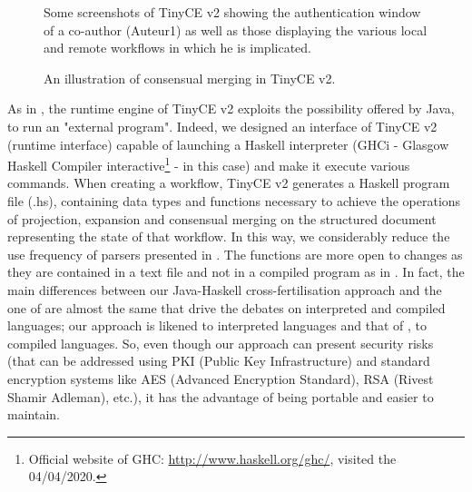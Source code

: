 \begin{figure}[ht!]
	\noindent
	\caption{Some screenshots of TinyCE v2 showing the authentication window of a co-author (Auteur1) as well as those displaying the various local and remote workflows in which he is implicated.}
	\label{chap2:fig:user-connexion}
\end{figure}

\begin{figure}[ht!]
	\noindent
	\caption{An illustration of consensual merging in TinyCE v2.}
	\label{chap2:fig:workflow-merging}
\end{figure}

\label{chap2:sec:archi-tinyce-v2-cross-fertilisation}
As in \cite{artTinyCE}, the runtime engine of TinyCE v2 exploits the possibility offered by Java, to run an "external program".  Indeed, we designed an interface of TinyCE v2 (runtime interface) capable of launching a Haskell interpreter (GHCi - Glasgow Haskell Compiler interactive\footnote{Official website of GHC: \url{http://www.haskell.org/ghc/}, visited the 04/04/2020.} - in this case) and make it execute various commands. When creating a workflow, TinyCE v2 generates a Haskell program file (.hs), containing data types and functions necessary to achieve the operations of projection, expansion and consensual merging on the structured document representing the state of that workflow. In this way, we considerably reduce the use frequency of parsers presented in \cite{artTinyCE}. The functions are more open to changes as they are contained in a text file and not in a compiled program as in \cite{artTinyCE}. In fact, the main differences between our Java-Haskell cross-fertilisation approach and the one of \cite{artTinyCE} are almost the same that drive the debates on interpreted and compiled languages; our approach is likened to interpreted languages and that of \cite{artTinyCE}, to compiled languages. So, even though our approach can present security risks (that can be addressed using PKI (Public Key Infrastructure) and standard encryption systems like AES (Advanced Encryption Standard), RSA (Rivest Shamir Adleman), etc.), it has the advantage of being portable and easier to maintain. 
